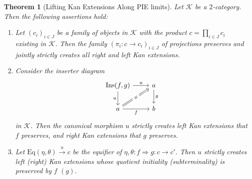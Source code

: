 \documentclass[11pt]{article}
\theoremstyle{plain}
\newtheorem{theorem}{Theorem}[section]
\theoremstyle{definition}
\numberwithin{equation}{section}
\newcommand{\K}{\mathcal{K}}
\newcommand{\Ins}{\mathrm{Ins}}
\newcommand{\Eq}{\mathrm{Eq}}
\begin{document}
\begin{theorem}[Lifting Kan Extensions Along PIE limits]\label{thm:pie_kan_creation}
   Let $\K$ be a $2$-category. Then the following assertions hold:
   \begin{enumerate}
       \item Let $(c_i)_{i \in J}$ be a family of objects in $\K$ with the product $c = \prod_{i\in J} c_i$ existing in $\K$. Then the family $(\pi_i \colon c \to c_i)_{i\in J}$ of projections preserves and jointly strictly creates all right and left Kan extensions.
       \item Consider the inserter diagram
       $$
\begin{tikzcd}
{\Ins(f,g)} \arrow[d, "u"'] \arrow[r, "u"]        & a \arrow[d, "g"] \\
a \arrow[r, "f"'] \arrow[ru, "\phi" description, Rightarrow] & b               
\end{tikzcd}
$$
       in $\K$. Then the canonical morphism $u$ strictly creates left Kan extensions that $f$ preserves, and right Kan extensions that $g$ preserves.
       \item Let $\Eq(\eta,\theta)\xrightarrow{u}c$ be the equifier of $\eta,\theta \colon f \Rightarrow g \colon c \to c'$. Then $u$ strictly creates left (right) Kan extensions whose quotient initiality (subterminality) is preserved by $f$ $(g)$. 
   \end{enumerate}
\end{theorem}
\end{document}
